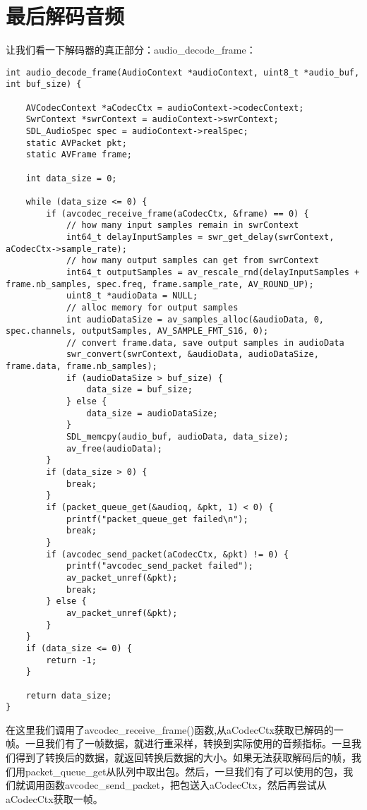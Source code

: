\section{最后解码音频}
让我们看一下解码器的真正部分：audio_decode_frame：
\begin{lstlisting}
int audio_decode_frame(AudioContext *audioContext, uint8_t *audio_buf, int buf_size) {

    AVCodecContext *aCodecCtx = audioContext->codecContext;
    SwrContext *swrContext = audioContext->swrContext;
    SDL_AudioSpec spec = audioContext->realSpec;
    static AVPacket pkt;
    static AVFrame frame;

    int data_size = 0;

    while (data_size <= 0) {
        if (avcodec_receive_frame(aCodecCtx, &frame) == 0) {
            // how many input samples remain in swrContext
            int64_t delayInputSamples = swr_get_delay(swrContext, aCodecCtx->sample_rate);
            // how many output samples can get from swrContext
            int64_t outputSamples = av_rescale_rnd(delayInputSamples + frame.nb_samples, spec.freq, frame.sample_rate, AV_ROUND_UP);
            uint8_t *audioData = NULL;
            // alloc memory for output samples
            int audioDataSize = av_samples_alloc(&audioData, 0, spec.channels, outputSamples, AV_SAMPLE_FMT_S16, 0);
            // convert frame.data, save output samples in audioData
            swr_convert(swrContext, &audioData, audioDataSize, frame.data, frame.nb_samples);
            if (audioDataSize > buf_size) {
                data_size = buf_size;
            } else {
                data_size = audioDataSize;
            }
            SDL_memcpy(audio_buf, audioData, data_size);
            av_free(audioData);
        }
        if (data_size > 0) {
            break;
        }
        if (packet_queue_get(&audioq, &pkt, 1) < 0) {
            printf("packet_queue_get failed\n");
            break;
        }
        if (avcodec_send_packet(aCodecCtx, &pkt) != 0) {
            printf("avcodec_send_packet failed");
            av_packet_unref(&pkt);
            break;
        } else {
            av_packet_unref(&pkt);
        }
    }
    if (data_size <= 0) {
        return -1;
    }

    return data_size;
}
\end{lstlisting}

在这里我们调用了avcodec_receive_frame()函数,从aCodecCtx获取已解码的一帧。一旦我们有了一帧数据，就进行重采样，转换到实际使用的音频指标。一旦我们得到了转换后的数据，就返回转换后数据的大小。如果无法获取解码后的帧，我们用packet_queue_get从队列中取出包。然后，一旦我们有了可以使用的包，我们就调用函数avcodec_send_packet，把包送入aCodecCtx，然后再尝试从aCodecCtx获取一帧。

